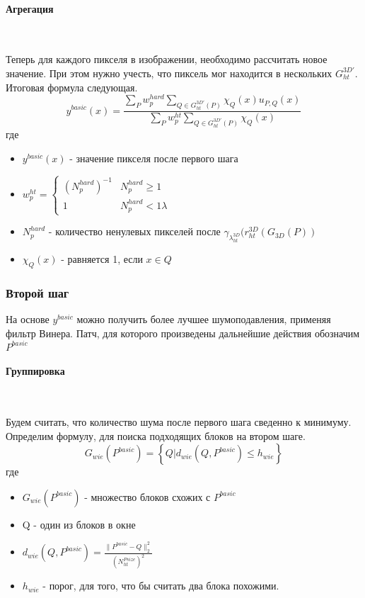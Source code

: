 \paragraph{Агрегация}\

Теперь для каждого пикселя в изображении, необходимо рассчитать новое значение. При этом нужно учесть, что пиксель мог находится в нескольких $G_{ht}^{3D'}$. Итоговая формула следующая.
\begin{equation}
	y^{basic}(x) = \frac{\sum\limits_Pw_p^{hard}\sum\limits_{Q \in G_{ht}^{3D'}(P)}\chi_Q(x)u_{P,Q}(x)}{\sum\limits_Pw_p^{ht}\sum\limits_{Q \in G_{ht}^{3D'}(P)}\chi_Q(x)}
\end{equation}
где
\begin{itemize}
	\item $y^{basic}(x)$ - значение пикселя после первого шага 
	\item $w_p^{ht}  = \begin{cases}(N_p^{hard})^{-1} & N_p^{hard} \geq 1\\ 1 & N_p^{hard} < 1 \lambda\end{cases}$
	\item $N_p^{hard}$ - количество ненулевых пикселей после $\gamma_{\lambda_{ht}^{3D}}(r_{ht}^{3D}(G_{3D}(P))$
	\item $\chi_Q(x)$ - равняется 1, если $x\in Q$
\end{itemize}

\subsubsection{Второй шаг}
На основе $y^{basic}$ можно получить более лучшее шумоподавления, применяя фильтр Винера. Патч, для которого произведены дальнейшие действия обозначим $P^{basic}$
\paragraph{Группировка}\

Будем считать, что количество шума после первого шага сведенно к минимуму. Определим формулу, для поиска подходящих блоков на втором шаге.
\begin{equation}
	G_{wie}(P^{basic}) = \left\{Q | d_{wie}(Q,P^{basic}) \leq h_{wie}\right\}
\end{equation}
где
\begin{itemize}
	\item $G_{wie}(P^{basic})$ - множество блоков схожих с $P^{basic}$
	\item Q - один из блоков в окне
	\item $d_{wie}(Q,P^{basic}) = \frac{\parallel P^{basic} - Q\parallel_2^2}{(N_{ht}^{Psize})^2}$
	\item $h_{wie}$ - порог, для того, что бы считать два блока похожими.
\end{itemize}

